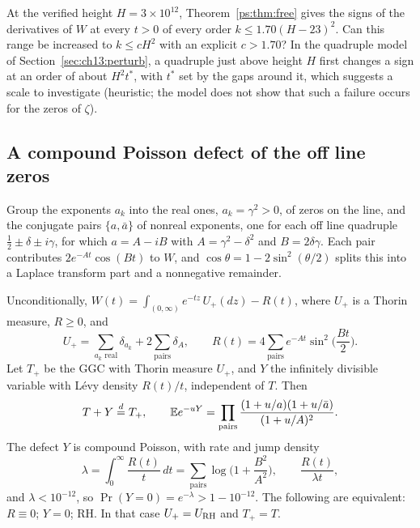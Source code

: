 \begin{problem}\label{prob:ch12:order}
At the verified height $H=3\times10^{12}$, Theorem~\ref{ps:thm:free} gives the signs of the derivatives of $W$ at every $t>0$ of every order $k\le1.70(H-23)^2$. Can this range be increased to $k\le cH^2$ with an explicit $c>1.70$? In the quadruple model of Section~\ref{sec:ch13:perturb}, a quadruple just above height $H$ first changes a sign at an order of about $H^2t^*$, with $t^*$ set by the gaps around it, which suggests a scale to investigate (heuristic; the model does not show that such a failure occurs for the zeros of $\zeta$).
\end{problem}

\subsection{A compound Poisson defect of the off line zeros}\label{sec:xg:defect}

Group the exponents $a_k$ into the real ones, $a_k=\gamma^2>0$, of zeros on the line, and the conjugate pairs $\{a,\bar a\}$ of nonreal exponents, one for each off line quadruple $\frac12\pm\delta\pm i\gamma$, for which $a=A-iB$ with $A=\gamma^2-\delta^2$ and $B=2\delta\gamma$. Each pair contributes $2e^{-At}\cos(Bt)$ to $W$, and $\cos\theta=1-2\sin^2(\theta/2)$ splits this into a Laplace transform part and a nonnegative remainder.

\begin{theorem}\label{xg:thm:defect}
Unconditionally, $W(t)=\int_{(0,\infty)}e^{-tz}\,U_+(dz)-R(t)$, where $U_+$ is a Thorin measure, $R\ge0$, and
\[
U_+=\sum_{a_k\text{ real}}\delta_{a_k}+2\sum_{\text{pairs}}\delta_A,\qquad R(t)=4\sum_{\text{pairs}}e^{-At}\sin^2\!\Big(\frac{Bt}2\Big).
\]
Let $T_+$ be the GGC with Thorin measure $U_+$, and $Y$ the infinitely divisible variable with L\'evy density $R(t)/t$, independent of $T$. Then
\[
T+Y\stackrel d=T_+,\qquad \mathbb{E} e^{-uY}=\prod_{\text{pairs}}\frac{(1+u/a)(1+u/\bar a)}{(1+u/A)^2}.
\]
The defect $Y$ is compound Poisson, with rate and jump density
\[
\lambda=\int_0^\infty\frac{R(t)}t\,dt=\sum_{\text{pairs}}\log\Big(1+\frac{B^2}{A^2}\Big),\qquad\frac{R(t)}{\lambda t},
\]
and $\lambda<10^{-12}$, so $\Pr(Y=0)=e^{-\lambda}>1-10^{-12}$. The following are equivalent: $R\equiv0$; $Y=0$; RH. In that case $U_+=U_{\mathrm{RH}}$ and $T_+=T$.
\end{theorem}

